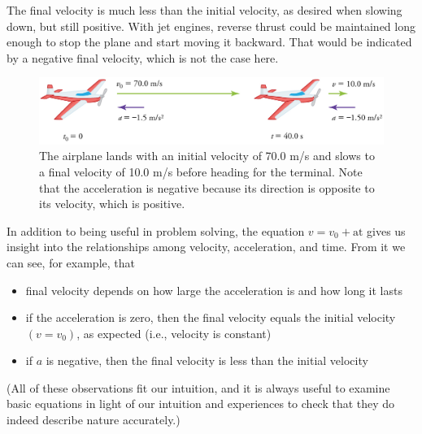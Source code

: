 \documentclass[
]{book}
\providecommand{\tightlist}{%
  \setlength{\itemsep}{0pt}\setlength{\parskip}{0pt}}
\begin{document}
The final velocity is much less than the initial velocity, as desired
when slowing down, but still positive. With jet engines, reverse thrust
could be maintained long enough to stop the plane and start moving it
backward. That would be indicated by a negative final velocity, which is
not the case here.

\begin{figure}
\hypertarget{import-auto-id2173965}{%
\centering
\includegraphics{images/Figure_02_04_01.jpg}
\caption{The airplane lands with an initial velocity of 70.0 m/s and slows to a
final velocity of 10.0 m/s before heading for the terminal. Note that
the acceleration is negative because its direction is opposite to its
velocity, which is
positive.}\label{import-auto-id2173965}
}
\end{figure}

In addition to being useful in problem solving, the equation
\({v = {v_{0} + \text{at}}}{}\) gives us insight into the relationships
among velocity, acceleration, and time. From it we can see, for example,
that

\begin{itemize}
\tightlist
\item
  \protect\hypertarget{import-auto-id2180047}{}{final velocity depends on how large the acceleration is and how
  long it lasts}
\item
  \protect\hypertarget{import-auto-id2180050}{}{if the acceleration is zero, then the final velocity equals the
  initial velocity \({({v = v_{0}})}{}\), as expected (i.e., velocity is
  constant)}
\item
  \protect\hypertarget{import-auto-id2175665}{}{if \emph{\(a{}\)} is negative, then the final velocity is less than the
  initial velocity}
\end{itemize}

(All of these observations fit our intuition, and it is always useful to
examine basic equations in light of our intuition and experiences to
check that they do indeed describe nature accurately.)
\end{document}
